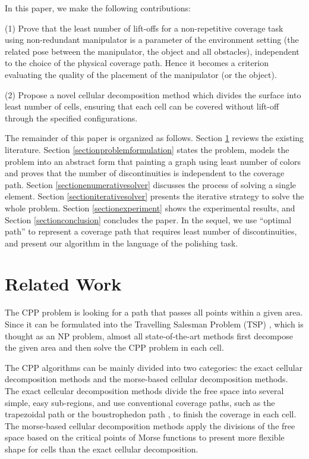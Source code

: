 \documentclass[journal]{IEEEtran}
\begin{document}
In this paper, we make the following contributions: 

(1) Prove that the least number of lift-offs for a non-repetitive coverage task using non-redundant manipulator is a parameter of the environment setting (the related pose between the manipulator, the object and all obstacles), independent to the choice of the physical coverage path. Hence it becomes a criterion evaluating the quality of the placement of the manipulator (or the object). 

(2) Propose a novel cellular decomposition method which divides the surface into least number of cells, ensuring that each cell can be covered without lift-off through the specified configurations. 


The remainder of this paper is organized as follows. Section \ref{sectionrelatedwork} reviews the existing literature. 
Section \ref{sectionproblemformulation} states the problem, models the problem into an abstract form that painting a graph using least number of colors and proves that the number of discontinuities is independent to the coverage path. 
Section \ref{sectionenumerativesolver} discusses the process of solving a single element. Section \ref{sectioniterativesolver} presents the iterative strategy to solve the whole problem. Section \ref{sectionexperiment} shows the experimental results, and Section \ref{sectionconclusion} concludes the paper. In the sequel, we use ``optimal path'' to represent a coverage path that requires least number of discontinuities, and present our algorithm in the language of the polishing task. 



\section{Related Work}\label{sectionrelatedwork}
The CPP problem is looking for a path that passes all points within a given area. 
Since it can be formulated into the Travelling Salesman Problem (TSP) \cite{choset2001coverage}\cite{galceran2013a}, which is thought as an NP problem, almost all state-of-the-art methods first decompose the given area and then solve the CPP problem in each cell. 

The CPP algorithms can be mainly divided into two categories: the exact cellular decomposition methods and the morse-based cellular decomposition methods. 
The exact cellcular decomposition methods \cite{lumelsky1990dynamic} divide the free space into several simple, easy sub-regions, and use conventional coverage paths, such as the trapezoidal path \cite{choset2005principles} or the boustrophedon path \cite{choset1998coverage}\cite{choset2000coverage}, to finish the coverage in each cell. 
The morse-based cellular decomposition methods apply the divisions of the free space based on the critical points of Morse functions \cite{choset2000exact}\cite{Acar2002Morse} to  present more flexible shape for cells than the exact cellular decomposition. 
\end{document}
